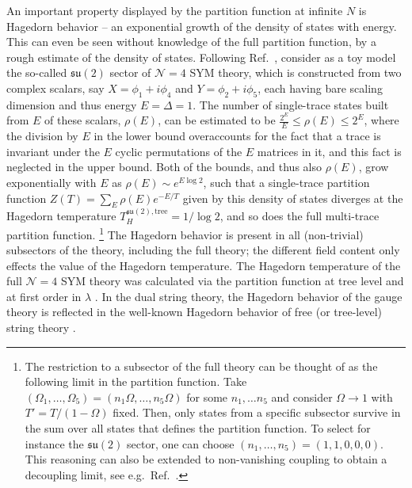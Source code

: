 \documentclass[a4paper,11pt]{article}
\begin{document}
An important property displayed by the partition function at infinite $N$ is Hagedorn behavior -- an exponential growth of the density of states with energy.
This can even be seen without knowledge of the full partition function, by a rough estimate of the density of states.
Following Ref.\ \cite{Aharony:2003sx}, consider as a toy model the so-called $\mathfrak{su}(2)$ sector of $\mathcal{N}=4$ SYM theory, which is constructed from two complex scalars, say $X=\phi_1+i\phi_4$ and $Y=\phi_2+i\phi_5$, each having bare scaling dimension and thus energy $E=\Delta=1$. The number of single-trace states built from $E$ of these scalars, $\rho(E)$, can be estimated to be $\frac{2^E}{E}\leq \rho(E) \leq 2^E$, where the division by $E$ in the lower bound overaccounts for the fact that a trace is invariant under the $E$ cyclic permutations of the $E$ matrices in it, and this fact is neglected in the upper bound.
Both of the bounds, and thus also $\rho(E)$, grow exponentially with $E$ as $\rho(E)\sim e^{E\log2}$, such that a single-trace partition function $Z(T)=\sum_E \rho(E) e^{-E/T}$ given by this density of states diverges at the Hagedorn temperature $T_H^{\mathfrak{su}(2),\text{tree}}=1/\log2$, and so does the full multi-trace partition function.%
\footnote{The restriction to a subsector of the full theory can be thought of as the following limit in the partition function. Take $(\Omega_1,\dots,\Omega_5)=(n_1\Omega,\dots,n_5\Omega)$ for some $n_1,\dots n_5$ and consider $\Omega\to1$ with $T'=T/(1-\Omega)$ fixed. Then, only states from a specific subsector survive in the sum over all states that defines the partition function. To select for instance the $\mathfrak{su}(2)$ sector, one can choose $(n_1,\dots,n_5)=(1,1,0,0,0)$. This reasoning can also be extended to non-vanishing coupling to obtain a decoupling limit, see e.g.\ Ref.\ \cite{Harmark:2007px}.}
The Hagedorn behavior is present in all (non-trivial) subsectors of the theory, including the full theory; the different field content only effects the value of the Hagedorn temperature.
The Hagedorn temperature of the full $\mathcal{N}=4$ SYM theory was calculated via the partition function at tree level \cite{Sundborg:1999ue} and at first order in $\lambda$ \cite{Spradlin:2004pp}.
In the dual string theory, the Hagedorn behavior of the gauge theory is reflected in the well-known Hagedorn behavior of free (or tree-level) string theory \cite{Atick:1988}.
\end{document}
